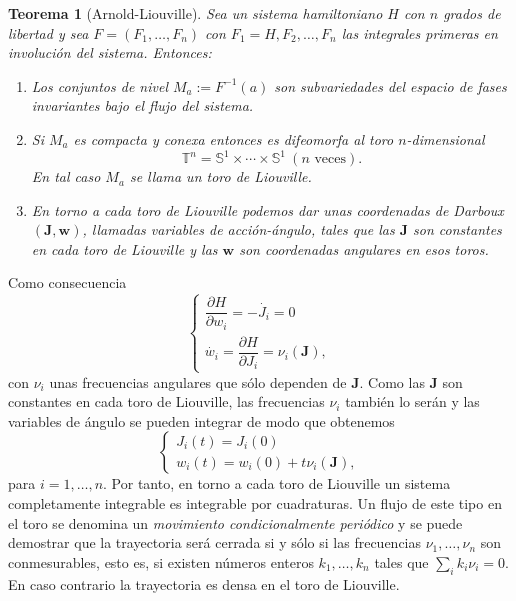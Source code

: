 \documentclass[11pt,a4paper,twoside]{article}
\newtheorem{thm}{Teorema}[section]
\theoremstyle{definition} \newtheorem{defn}[thm]{Definición}
\theoremstyle{definition} \newtheorem{ejemplo}[thm]{Ejemplo}
\theoremstyle{definition} \newtheorem{ejercicio}[thm]{Ejercicio}
\theoremstyle{remark} \newtheorem*{obs}{Observación}
\def\TT{\mathbb{T}}
\newcommand{\vect}[1]{\mathbf{#1}}
\begin{document}
  \begin{thm}[Arnold-Liouville]\label{arnoldliouville}
   Sea un sistema hamiltoniano $H$ con $n$ grados de libertad y sea $F=(F_1,\dots,F_n)$ con $F_1=H,F_2,\dots,F_n$ las integrales primeras en involución del sistema. Entonces:
   \begin{enumerate}
     \item Los conjuntos de nivel $M_a:=F^{-1}(a)$ son subvariedades del espacio de fases invariantes bajo el flujo del sistema.
     \item Si $M_a$ es compacta y conexa entonces es difeomorfa al toro $n$-dimensional
       \begin{equation*}
	 \TT^n=\mathbb{S} ^1 \times \cdots \times \mathbb{S}^1 \ (n \text{ veces}).
       \end{equation*}
       En tal caso $M_a$ se llama un \emph{toro de Liouville}.
     \item En torno a cada toro de Liouville podemos dar unas coordenadas de Darboux $(\vect{J},\vect{w})$, llamadas \emph{variables de acción-ángulo}, tales que las $\vect{J}$ son constantes en cada toro de Liouville y las $\vect{w}$ son coordenadas angulares en esos toros. 
   \end{enumerate}
  \end{thm}
  Como consecuencia
       \begin{equation}
	 \begin{cases}
	   \dfrac{\partial H}{\partial w_i}=-\dot{J_i}=0 \\[5 pt]
	   \dot{w_i}=\dfrac{\partial H}{\partial J_i}=\nu_i(\vect{J}), 
	 \end{cases}
       \end{equation}
       con $\nu_i$ unas frecuencias angulares que sólo dependen de $\vect{J}$.
       Como las $\vect{J}$ son constantes en cada toro de Liouville, las frecuencias $\nu_i$ también lo serán y las variables de ángulo se pueden integrar de modo que obtenemos
       \begin{equation}
	 \begin{cases}
	  J_i(t)=J_i(0) \\
	 w_i(t)=w_i(0)+t \nu_i(\vect{J}),
	 \end{cases}
       \end{equation}
       para $i=1,\dots,n$.
       Por tanto, en torno a cada toro de Liouville un sistema completamente integrable es integrable por cuadraturas. Un flujo de este tipo en el toro se denomina un \emph{movimiento condicionalmente periódico} y se puede demostrar \cite{arnold} que la trayectoria será cerrada si y sólo si las frecuencias $\nu_1,\dots,\nu_n$ son conmesurables, esto es, si existen números enteros $k_1,\dots,k_n$ tales que $\sum_i k_i\nu_i=0$. En caso contrario la trayectoria es densa en el toro de Liouville.
\end{document}
